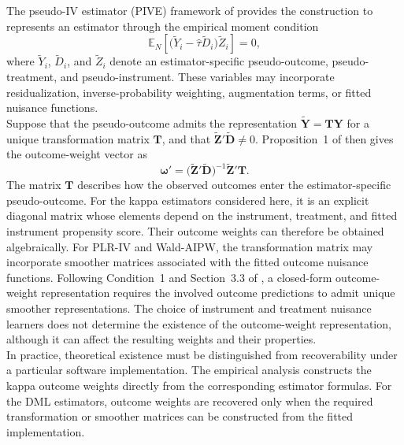 \documentclass[12pt, a4paper, oneside]{article}
\theoremstyle{plain}
\theoremstyle{definition}
\begin{document}
 The pseudo-IV estimator (PIVE) framework of
\citet{knaus2024treatment} provides the construction to represents an
estimator through the empirical moment condition
\begin{equation}
    \mathbb{E}_N\!\left[
        \bigl(\widetilde{Y}_i
        -\widehat{\tau}\widetilde{D}_i\bigr)
        \widetilde{Z}_i
    \right]
    =0,
    \label{eq:pive_moment_thesis}
\end{equation}
where \(\widetilde{Y}_i\), \(\widetilde{D}_i\), and
\(\widetilde{Z}_i\) denote an estimator-specific pseudo-outcome,
pseudo-treatment, and pseudo-instrument. These variables may incorporate
residualization, inverse-probability weighting, augmentation terms, or fitted
nuisance functions.\\
Suppose that the pseudo-outcome admits the representation
\(\widetilde{\mathbf Y}=\mathbf T\mathbf Y\) for a unique transformation
matrix \(\mathbf T\), and that
\(\widetilde{\mathbf Z}'\widetilde{\mathbf D}\neq0\). Proposition~1 of
\citet{knaus2024treatment} then gives the outcome-weight vector as
\begin{equation}
    \boxed{
    \boldsymbol{\omega}'
    =
    \bigl(\widetilde{\mathbf Z}'\widetilde{\mathbf D}\bigr)^{-1}
    \widetilde{\mathbf Z}'\mathbf T.
    }
    \label{eq:pive_outcome_weights_thesis}
\end{equation}
The matrix \(\mathbf T\) describes how the observed outcomes enter the
estimator-specific pseudo-outcome. For the kappa estimators considered here,
it is an explicit diagonal matrix whose elements depend on the instrument,
treatment, and fitted instrument propensity score. Their outcome weights can
therefore be obtained algebraically. For PLR-IV and Wald-AIPW, the transformation matrix may incorporate
smoother matrices associated with the fitted outcome nuisance functions.
Following Condition~1 and Section~3.3 of
\citet{knaus2024treatment}, a closed-form outcome-weight representation
requires the involved outcome predictions to admit unique smoother
representations. The choice of instrument and treatment nuisance learners
does not determine the existence of the outcome-weight representation,
although it can affect the resulting weights and their properties.\\
In practice, theoretical existence must be distinguished from recoverability
under a particular software implementation. The empirical analysis constructs
the kappa outcome weights directly from the corresponding estimator formulas.
For the DML estimators, outcome weights are recovered only when the required
transformation or smoother matrices can be constructed from the fitted
implementation.
\end{document}
